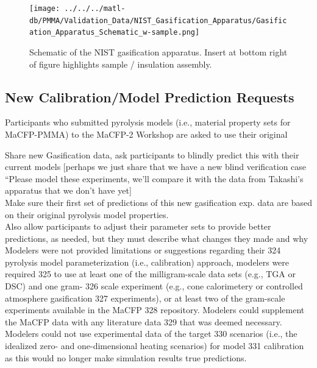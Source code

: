 \documentclass[12pt]{article}
\begin{document}
\begin{figure}
     \centering
         \texttt{[image: ../../../matl-db/PMMA/Validation\_Data/NIST\_Gasification\_Apparatus/Gasification\_Apparatus\_Schematic\_w-sample.png]}
         \caption{ Schematic of the NIST gasification apparatus. Insert at bottom right of figure highlights sample / insulation assembly.}
         \label{fig:NISTGasApp}
\end{figure}

\subsection{New Calibration/Model Prediction Requests }
Participants who submitted pyrolysis models (i.e., material property sets for MaCFP-PMMA) to the MaCFP-2 Workshop are asked to use their original 

 Share new Gasification data, ask participants to blindly predict this with their current models [perhaps we just share that we have a new blind verification case “Please model these experiments, we’ll compare it with the data from Takashi’s apparatus that we don’t have yet]\\
Make sure their first set of predictions of this new gasification exp. data are based on their original pyrolysis model properties.\\
Also allow participants to adjust their parameter sets to provide better predictions, as needed, but they must describe what changes they made and why\\


Modelers were not provided limitations or suggestions regarding their 324
pyrolysis model parameterization (i.e., calibration) approach, modelers were required 325
to use at least one of the milligram-scale data sets (e.g., TGA or DSC) and one gram- 326
scale experiment (e.g., cone calorimetery or controlled atmosphere gasification 327
experiments), or at least two of the gram-scale experiments available in the MaCFP 328
repository. Modelers could supplement the MaCFP data with any literature data 329
that was deemed necessary. Modelers could not use experimental data of the target 330
scenarios (i.e., the idealized zero- and one-dimensional heating scenarios) for model 331
calibration as this would no longer make simulation results true predictions. 



\clearpage
\end{document}
